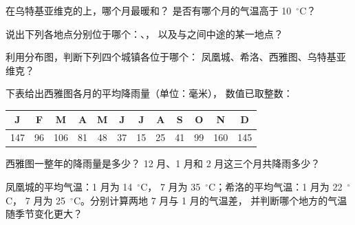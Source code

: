 \begin{exercise}[$\star$]\label{exo:g5:weather-and-climate:4}
在乌特基亚维克的上，哪个月最暖和？
是否有哪个月的气温高于 10~$^\circ$C？
\end{exercise}

\begin{exercise}[$\star$]\label{exo:g5:weather-and-climate:5}
说出下列各地点分别位于哪个：、，
以及与之间中途的某一地点？
\end{exercise}

\begin{exercise}[$\star$]\label{exo:g5:weather-and-climate:6}
利用分布图，判断下列四个城镇各位于哪个：
凤凰城、希洛、西雅图、乌特基亚维克？
\end{exercise}

\begin{exercise}[$\star\star$]\label{exo:g5:weather-and-climate:7}
下表给出西雅图各月的平均降雨量（单位：毫米），
数值已取整数：
\begin{center}
\begin{tabular}{|*{12}{c|}}
\hline
J & F & M & A & M & J & J & A & S & O & N & D\\
\hline
147 & 96 & 106 & 81 & 48 & 37 & 15 & 25 & 41 & 99 & 160 & 145\\
\hline
\end{tabular}
\end{center}
西雅图一整年的降雨量是多少？
12 月、1 月和 2 月这三个月共降雨多少？
\end{exercise}

\begin{exercise}[$\star\star$]\label{exo:g5:weather-and-climate:8}
凤凰城的平均气温：1 月为 14~$^\circ$C，
7 月为 35~$^\circ$C；希洛的平均气温：1 月为 22~$^\circ$C，
7 月为 25~$^\circ$C。分别计算两地 7 月与 1 月的气温差，
并判断哪个地方的气温随季节变化更大？
\end{exercise}

